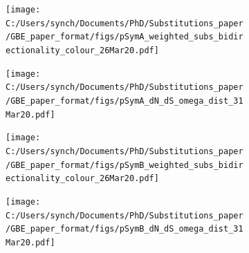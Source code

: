 \documentclass[12pt]{article}
\begin{document}
\begin{figure}
	\centering
	\begin{subfigure}{.5\textwidth}
		\centering
		\texttt{[image: C:/Users/synch/Documents/PhD/Substitutions\_paper/GBE\_paper\_format/figs/pSymA\_weighted\_subs\_bidirectionality\_colour\_26Mar20.pdf]}
		\caption{}
		\label{fig:sP1}
	\end{subfigure}%
	\begin{subfigure}{.5\textwidth}
		\centering
		\texttt{[image: C:/Users/synch/Documents/PhD/Substitutions\_paper/GBE\_paper\_format/figs/pSymA\_dN\_dS\_omega\_dist\_31Mar20.pdf]}
		\caption{}
		\label{fig:sP2}
	\end{subfigure}
	\label{fig:pSymA}
\end{figure}

\begin{figure}
	\centering
	\begin{subfigure}{.5\textwidth}
		\centering
		\texttt{[image: C:/Users/synch/Documents/PhD/Substitutions\_paper/GBE\_paper\_format/figs/pSymB\_weighted\_subs\_bidirectionality\_colour\_26Mar20.pdf]}
		\caption{}
		\label{fig:sB1}
	\end{subfigure}%
	\begin{subfigure}{.5\textwidth}
		\centering
		\texttt{[image: C:/Users/synch/Documents/PhD/Substitutions\_paper/GBE\_paper\_format/figs/pSymB\_dN\_dS\_omega\_dist\_31Mar20.pdf]}
		\caption{}
		\label{fig:sB2}
	\end{subfigure}
	\label{fig:pSymB}
\end{figure}
\end{document}
